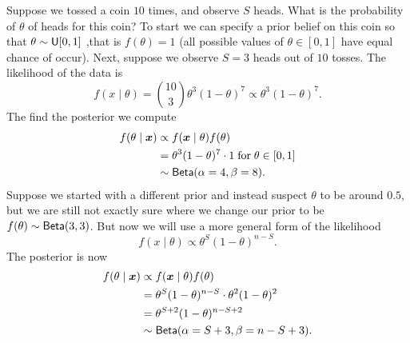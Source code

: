 \begin{exam} \label{exam: coin_eg}
    Suppose we tossed a coin $10$ times, and observe $S$ heads. What is the probability of $\theta$ of heads for this coin? To start we can specify a prior belief on this coin so that $\theta \sim {\sf U} [0,1]$ ,that is $f(\theta) = 1$ (all possible values of $\theta \in [0,1]$ have equal chance of occur). Next, suppose we observe $S=3$ heads out of $10$ tosses. The likelihood of the data is
    \[
        f(x \mid \theta) = \binom{10}{3} \theta^3 (1-\theta)^{7} \propto \theta^3 (1-\theta)^{7}.
    \]
    The find the posterior we compute
    \begin{align*}
        f(\theta \mid \bm{x})
         & \propto f(\bm{x} \mid \theta) f(\theta)                             \\
         & = \theta^3 (1-\theta)^{7} \cdot 1 \; \text{for} \; \theta \in [0,1] \\
         & \sim {\sf Beta} (\alpha = 4, \beta =8).
    \end{align*}
    Suppose we started with a different prior and instead suspect $\theta$ to be around $0.5$, but we are still not exactly sure where we change our prior to be $f(\theta) \sim {\sf Beta} (3,3)$. But now we will use a more general form of the likelihood
    \[
        f(x \mid \theta) \propto \theta^S (1-\theta)^{n-S}.
    \]
    The posterior is now
    \begin{align*}
        f(\theta \mid \bm{x})
         & \propto f(\bm{x} \mid \theta) f(\theta)                   \\
         & = \theta^S (1-\theta)^{n-S} \cdot \theta^2 (1-\theta)^{2} \\
         & = \theta^{S + 2} (1-\theta)^{n-S+2}                       \\
         & \sim {\sf Beta} (\alpha = S+3, \beta =n-S+3).
    \end{align*}
\end{exam}


